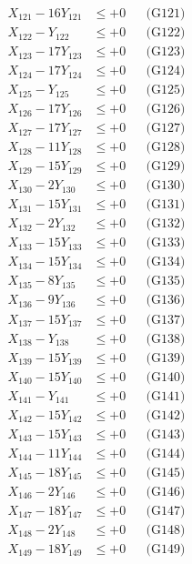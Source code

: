 \documentclass[a4paper,10pt]{article}
\begin{document}
{\begin{align}
X_{121} - 16Y_{121} &\leq +0 && \text{(G121)} \\
X_{122} - Y_{122} &\leq +0 && \text{(G122)} \\
X_{123} - 17Y_{123} &\leq +0 && \text{(G123)} \\
X_{124} - 17Y_{124} &\leq +0 && \text{(G124)} \\
X_{125} - Y_{125} &\leq +0 && \text{(G125)} \\
X_{126} - 17Y_{126} &\leq +0 && \text{(G126)} \\
X_{127} - 17Y_{127} &\leq +0 && \text{(G127)} \\
\allowbreak
X_{128} - 11Y_{128} &\leq +0 && \text{(G128)} \\
X_{129} - 15Y_{129} &\leq +0 && \text{(G129)} \\
X_{130} - 2Y_{130} &\leq +0 && \text{(G130)} \\
X_{131} - 15Y_{131} &\leq +0 && \text{(G131)} \\
X_{132} - 2Y_{132} &\leq +0 && \text{(G132)} \\
X_{133} - 15Y_{133} &\leq +0 && \text{(G133)} \\
X_{134} - 15Y_{134} &\leq +0 && \text{(G134)} \\
X_{135} - 8Y_{135} &\leq +0 && \text{(G135)} \\
X_{136} - 9Y_{136} &\leq +0 && \text{(G136)} \\
X_{137} - 15Y_{137} &\leq +0 && \text{(G137)} \\
\allowbreak
X_{138} - Y_{138} &\leq +0 && \text{(G138)} \\
X_{139} - 15Y_{139} &\leq +0 && \text{(G139)} \\
X_{140} - 15Y_{140} &\leq +0 && \text{(G140)} \\
X_{141} - Y_{141} &\leq +0 && \text{(G141)} \\
X_{142} - 15Y_{142} &\leq +0 && \text{(G142)} \\
X_{143} - 15Y_{143} &\leq +0 && \text{(G143)} \\
X_{144} - 11Y_{144} &\leq +0 && \text{(G144)} \\
X_{145} - 18Y_{145} &\leq +0 && \text{(G145)} \\
X_{146} - 2Y_{146} &\leq +0 && \text{(G146)} \\
X_{147} - 18Y_{147} &\leq +0 && \text{(G147)} \\
\allowbreak
X_{148} - 2Y_{148} &\leq +0 && \text{(G148)} \\
X_{149} - 18Y_{149} &\leq +0 && \text{(G149)} \\

\end{align}}
\end{document}
